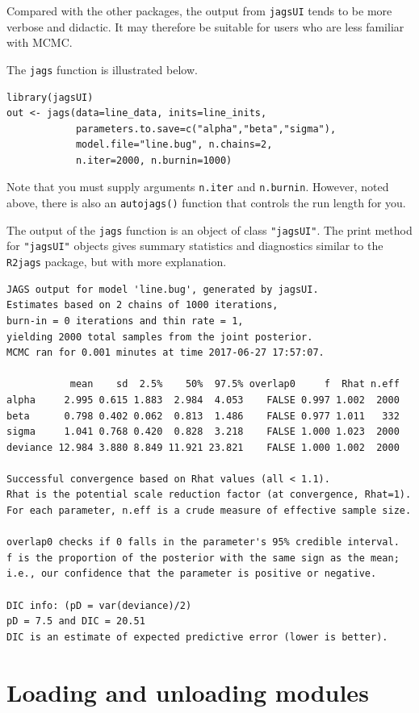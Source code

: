 \documentclass[11pt, a4paper, titlepage]{report}
\begin{document}
Compared with the other packages, the output from \texttt{jagsUI}
tends to be more verbose and didactic. It may therefore be suitable
for users who are less familiar with MCMC.

The \texttt{jags} function is illustrated below.
\begin{verbatim}
library(jagsUI)
out <- jags(data=line_data, inits=line_inits,
            parameters.to.save=c("alpha","beta","sigma"),
            model.file="line.bug", n.chains=2,
            n.iter=2000, n.burnin=1000)
\end{verbatim}
Note that you must supply arguments \texttt{n.iter} and
\texttt{n.burnin}. However, noted above, there is also an
\texttt{autojags()} function that controls the run length for you.

The output of the \texttt{jags} function is an object of class
\texttt{"jagsUI"}.  The print method for \texttt{"jagsUI"} objects
gives summary statistics and diagnostics similar to the
\texttt{R2jags} package, but with more explanation.
\begin{verbatim}
JAGS output for model 'line.bug', generated by jagsUI.
Estimates based on 2 chains of 1000 iterations,
burn-in = 0 iterations and thin rate = 1,
yielding 2000 total samples from the joint posterior. 
MCMC ran for 0.001 minutes at time 2017-06-27 17:57:07.

           mean    sd  2.5%    50%  97.5% overlap0     f  Rhat n.eff
alpha     2.995 0.615 1.883  2.984  4.053    FALSE 0.997 1.002  2000
beta      0.798 0.402 0.062  0.813  1.486    FALSE 0.977 1.011   332
sigma     1.041 0.768 0.420  0.828  3.218    FALSE 1.000 1.023  2000
deviance 12.984 3.880 8.849 11.921 23.821    FALSE 1.000 1.002  2000

Successful convergence based on Rhat values (all < 1.1). 
Rhat is the potential scale reduction factor (at convergence, Rhat=1). 
For each parameter, n.eff is a crude measure of effective sample size. 

overlap0 checks if 0 falls in the parameter's 95% credible interval.
f is the proportion of the posterior with the same sign as the mean;
i.e., our confidence that the parameter is positive or negative.

DIC info: (pD = var(deviance)/2) 
pD = 7.5 and DIC = 20.51 
DIC is an estimate of expected predictive error (lower is better).
\end{verbatim}

\section{Loading and unloading modules}
\label{section:R:modules}
\end{document}
